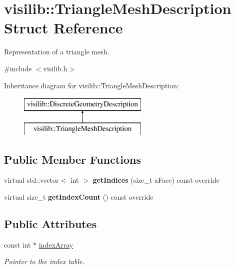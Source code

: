 \hypertarget{structvisilib_1_1_triangle_mesh_description}{}\section{visilib\+::Triangle\+Mesh\+Description Struct Reference}
\label{structvisilib_1_1_triangle_mesh_description}


Representation of a triangle mesh. 




{\ttfamily \#include $<$visilib.\+h$>$}

Inheritance diagram for visilib\+::Triangle\+Mesh\+Description\+:\begin{figure}[H]
\begin{center}
\leavevmode
\includegraphics[height=2.000000cm]{structvisilib_1_1_triangle_mesh_description}
\end{center}
\end{figure}
\subsection*{Public Member Functions}
\begin{DoxyCompactItemize}
\item 
\mbox{\label{structvisilib_1_1_triangle_mesh_description_ad9125f498b0e5eb05001e8706e7393f6}} 
virtual std\+::vector$<$ int $>$ {\bfseries get\+Indices} (size\+\_\+t a\+Face) const override
\item 
\mbox{\label{structvisilib_1_1_triangle_mesh_description_a2ad71fb110d51e86900312b4d2ac5cfd}} 
virtual size\+\_\+t {\bfseries get\+Index\+Count} () const override
\end{DoxyCompactItemize}
\subsection*{Public Attributes}
\begin{DoxyCompactItemize}
\item 
\mbox{\label{structvisilib_1_1_triangle_mesh_description_ad066f88f5351109e3900ae7356da5675}} 
const int $\ast$ \mbox{\hyperlink{structvisilib_1_1_triangle_mesh_description_ad066f88f5351109e3900ae7356da5675}{index\+Array}}
\begin{DoxyCompactList}\small\item\em Pointer to the index table. \end{DoxyCompactList}\end{DoxyCompactItemize}


